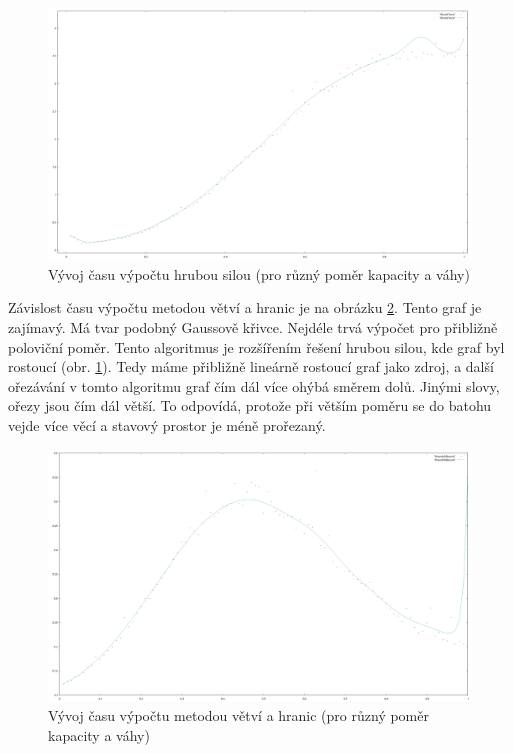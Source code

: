\documentclass[12pt,a4paper]{article}
\begin{document}
\begin{figure}[H]
\begin{center}
\includegraphics[width=\textwidth]{ratio/BruteForce}
\caption{Vývoj času výpočtu hrubou silou (pro různý poměr kapacity a váhy)}
\label{ratio/BruteForce}
\end{center}
\end{figure}

Závislost času výpočtu metodou větví a hranic je na obrázku \ref{ratio/BranchNBound}. Tento graf je zajímavý. Má tvar podobný Gaussově křivce. Nejdéle trvá výpočet pro přibližně poloviční poměr. Tento algoritmus je rozšířením řešení hrubou silou, kde graf byl rostoucí (obr. \ref{ratio/BruteForce}). Tedy máme přibližně lineárně rostoucí graf jako zdroj, a další ořezávání v tomto algoritmu graf čím dál více ohýbá směrem dolů. Jinými slovy, ořezy jsou čím dál větší. To odpovídá, protože při větším poměru se do batohu vejde více věcí a stavový prostor je méně prořezaný. 

\begin{figure}[H]
\begin{center}
\includegraphics[width=\textwidth]{ratio/BranchNBound}
\caption{Vývoj času výpočtu metodou větví a hranic (pro různý poměr kapacity a váhy)}
\label{ratio/BranchNBound}
\end{center}
\end{figure}
\end{document}
